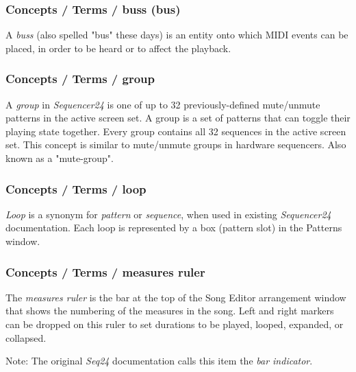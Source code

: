 \subsubsection{Concepts / Terms / buss (bus)}
\label{subsubsec:concepts_terms_buss}

   A \textsl{buss} (also spelled "bus" these days) is an entity onto which
   MIDI events can be placed, in order to be heard or to affect the
   playback.

\subsubsection{Concepts / Terms / group}
\label{subsubsec:concepts_terms_group}

   A \textsl{group} in \textsl{Sequencer24} is one of up to 32
   previously-defined mute/unmute patterns in the active screen set.
   A group is a set of patterns that can toggle their playing state
   together.  Every group contains all 32 sequences in the active screen
   set.  This concept is similar to mute/unmute groups in hardware
   sequencers.
   Also known as a "mute-group".

\subsubsection{Concepts / Terms / loop}
\label{subsubsec:concepts_terms_loop}

   \textsl{Loop}
   is a synonym for \textsl{pattern} or \textsl{sequence}, when used
   in existing \textsl{Sequencer24} documentation.
   Each loop is represented by a box (pattern slot) in the Patterns window.

\subsubsection{Concepts / Terms / measures ruler}
\label{subsubsec:concepts_terms_measures_ruler}

   The \textsl{measures ruler} is the bar at the top of the Song Editor
   arrangement window that shows the numbering of the measures in the song.
   Left and right markers can be dropped on this ruler to set durations to
   be played, looped, expanded, or collapsed.

   Note:
   The original \textsl{Seq24} documentation calls this item the
   \textsl{bar indicator}.

